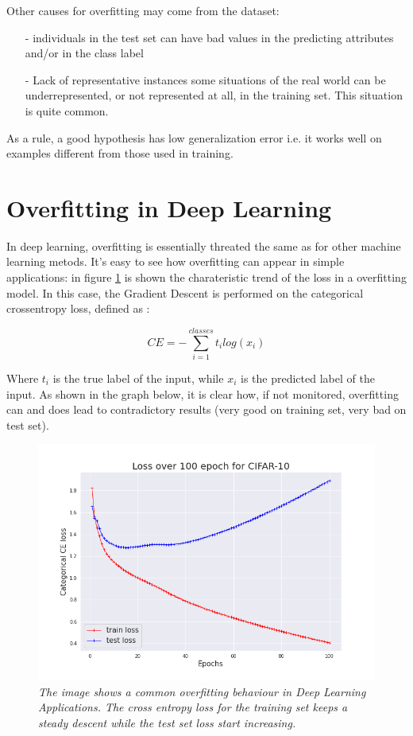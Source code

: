 \documentclass[11pt,a4paper]{article}
\begin{document}
Other causes for overfitting may come from the dataset: 

\begin{itemize}
 \item [-] individuals in the test set can have bad values in the predicting attributes
           and/or in the class label
 \item [-] Lack of representative instances some situations of the real world can be underrepresented, or not represented at all, in the training set. This situation is quite common.
\end{itemize}

As a rule, a good hypothesis has low generalization error i.e. it works well on examples different from those used in training.

\section*{Overfitting in Deep Learning}

In deep learning, overfitting is essentially threated the same as for other machine learning metods. 
It's easy to see how overfitting can appear in simple applications: in figure \ref{cifar-overfit-loss} is shown the charateristic trend of the loss in a overfitting model. 
In this case, the Gradient Descent is performed on the categorical crossentropy loss, defined as : 

\begin{equation}
  CE = -\sum_{i=1}^{classes} t_i log(x_i)
\end{equation}

Where $t_i$ is the true label of the input, while $x_i$ is the predicted label of the input.
As shown in the graph below, it is clear how, if not monitored, overfitting can and does lead to contradictory results (very good on training set, very bad on test set). 

\begin{figure}[H]
 \centering
 \includegraphics[scale=0.4]{../images/cifar10_100epochs_loss.png}
 \caption{\textit{The image shows a common overfitting behaviour in Deep Learning Applications. The cross entropy loss for the training set keeps a steady descent while the test set loss start increasing.}}  
 \label{cifar-overfit-loss}
\end{figure}
\end{document}
